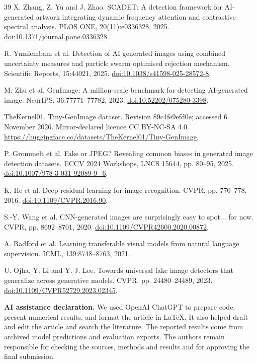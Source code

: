 \documentclass[11pt,a4paper]{article}
\begin{document}
\begin{thebibliography}{39}
 X. Zhang, Z. Yu and J. Zhao. SCADET: A detection framework for AI-generated artwork integrating dynamic frequency attention and contrastive spectral analysis. PLOS ONE, 20(11):e0336328, 2025. \href{https://doi.org/10.1371/journal.pone.0336328}{doi:10.1371/journal.pone.0336328}.

 R. Yumlembam et al. Detection of AI generated images using combined uncertainty measures and particle swarm optimised rejection mechanism. Scientific Reports, 15:44021, 2025. \href{https://doi.org/10.1038/s41598-025-28572-8}{doi:10.1038/s41598-025-28572-8}.

 M. Zhu et al. GenImage: A million-scale benchmark for detecting AI-generated image. NeurIPS, 36:77771--77782, 2023. \href{https://doi.org/10.52202/075280-3398}{doi:10.52202/075280-3398}.

 TheKernel01. Tiny-GenImage dataset. Revision 89c4fe9efd0e; accessed 6 November 2026. Mirror-declared licence CC BY-NC-SA 4.0. \url{https://huggingface.co/datasets/TheKernel01/Tiny-GenImage}.

 P. Grommelt et al. Fake or JPEG? Revealing common biases in generated image detection datasets. ECCV 2024 Workshops, LNCS 15644, pp. 80--95, 2025. \href{https://doi.org/10.1007/978-3-031-92089-9\_6}{doi:10.1007/978-3-031-92089-9\_6}.

 K. He et al. Deep residual learning for image recognition. CVPR, pp. 770--778, 2016. \href{https://doi.org/10.1109/CVPR.2016.90}{doi:10.1109/CVPR.2016.90}.

 S.-Y. Wang et al. CNN-generated images are surprisingly easy to spot... for now. CVPR, pp. 8692--8701, 2020. \href{https://doi.org/10.1109/CVPR42600.2020.00872}{doi:10.1109/CVPR42600.2020.00872}.

 A. Radford et al. Learning transferable visual models from natural language supervision. ICML, 139:8748--8763, 2021.

 U. Ojha, Y. Li and Y. J. Lee. Towards universal fake image detectors that generalize across generative models. CVPR, pp. 24480--24489, 2023. \href{https://doi.org/10.1109/CVPR52729.2023.02345}{doi:10.1109/CVPR52729.2023.02345}.
\end{thebibliography}
\par\medskip\noindent\textbf{AI assistance declaration.} We used OpenAI ChatGPT to prepare code, present numerical results, and format the article in LaTeX. It also helped draft and edit the article and search the literature. The reported results come from archived model predictions and evaluation exports. The authors remain responsible for checking the sources, methods and results and for approving the final submission.
\end{document}
